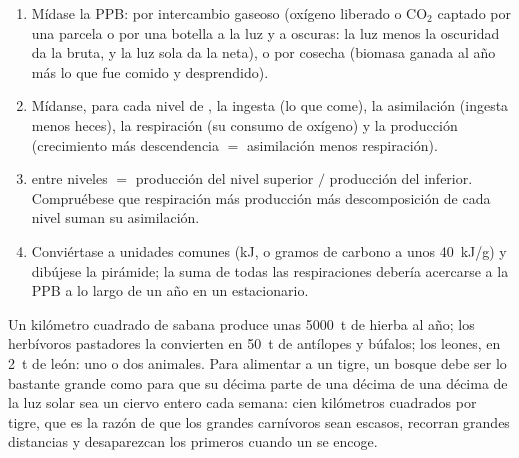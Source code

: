 \begin{method}\label{met:b1:ecosystem-organization:budget}
\begin{enumerate}
  \item Mídase la PPB: por intercambio gaseoso (oxígeno liberado o
        $\mathrm{CO_2}$ captado por una parcela o por una botella a la luz y
        a oscuras: la luz menos la oscuridad da la bruta, y la luz sola da
        la neta), o por cosecha (biomasa ganada al año más lo que fue comido
        y desprendido).
  \item Mídanse, para cada nivel de , la ingesta (lo que come),
        la asimilación (ingesta menos heces), la respiración (su consumo de
        oxígeno) y la producción (crecimiento más descendencia $=$
        asimilación menos respiración).
  \item {} entre niveles $=$ producción del nivel superior
        $/$ producción del inferior. Compruébese que respiración más
        producción más descomposición de cada nivel suman su asimilación.
  \item Conviértase a unidades comunes (\unit{kJ}, o gramos de carbono a
        unos \qty{40}{kJ/g}) y dibújese la pirámide; la suma de todas las
        respiraciones debería acercarse a la PPB a lo largo de un año en un
         estacionario.
\end{enumerate}
\end{method}

\begin{example}\label{ex:b1:ecosystem-organization:top}
Un kilómetro cuadrado de sabana produce unas \qty{5000}{t} de hierba al año;
los herbívoros pastadores la convierten en \qty{50}{t} de antílopes y
búfalos; los leones, en \qty{2}{t} de león: uno o dos animales. Para
alimentar a un tigre, un bosque debe ser lo bastante grande como para que su
décima parte de una décima de una décima de la luz solar sea un ciervo
entero cada semana: cien kilómetros cuadrados por tigre, que es la razón de
que los grandes carnívoros sean escasos, recorran grandes distancias y
desaparezcan los primeros cuando un  se encoge.
\end{example}

